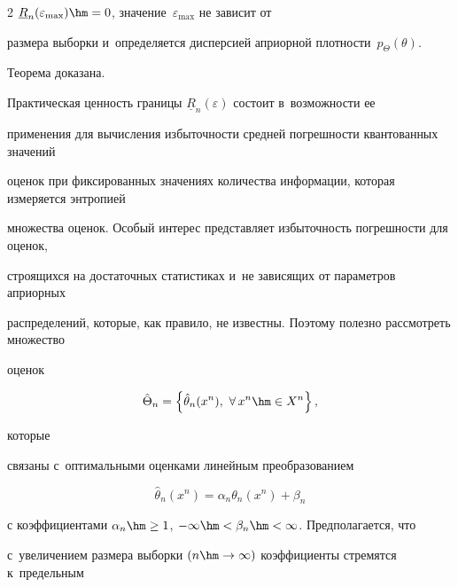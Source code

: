 \begin{multicols}{2}
$\underline{R}_n(\varepsilon_{\max})\hm=0$, значение~$\varepsilon_{\max}$ не зависит от 


размера выборки и~определяется дисперсией априорной плот\-ности~$p_{\Theta}(\theta)$. 


Тео\-ре\-ма доказана. 





\smallskip





Практическая ценность границы $\underline{R}_n(\varepsilon)$ со\-сто\-ит в~воз\-мож\-ности ее 


применения для вычисления из\-бы\-точ\-ности средней по\-греш\-ности квантованных значений 


оценок при фиксированных \mbox{значениях} количества информации, которая измеряется энт\-ро\-пи\-ей 


множества оценок. Особый интерес пред\-став\-ля\-ет из\-бы\-точ\-ность по\-греш\-ности для оценок, 


строящихся на достаточных статистиках и~не зависящих от па\-ра\-мет\-ров априорных 


распределений, которые, как правило, не известны. Поэтому полезно рассмотреть множество 


оценок 


$$


\hat{\Theta}_n= \left\{ \hat{\theta}_n(x^n),\ \forall\,x^n\hm\in X^n\right\},


$$


 которые 


связаны с~оптимальными оценками линейным преобразованием


\begin{equation}


\hat{\theta}_n(x^n) =\alpha_n \theta_n(x^n) +\beta_n


\label{e12-lan}


\end{equation}





\vspace*{-2pt}





\noindent


с коэффициентами $\alpha_n\hm\geq 1$, $-\infty \hm< \beta_n\hm< \infty$. Предполагается, что 


с~увеличением размера выборки $(n\hm\to \infty)$ коэффициенты стремятся к~предельным 



\end{multicols}
